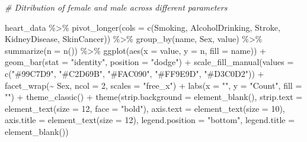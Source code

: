 \documentclass[
]{article}
\newenvironment{Shaded}{\begin{snugshade}}{\end{snugshade}}
\newcommand{\AttributeTok}[1]{\textcolor[rgb]{0.77,0.63,0.00}{#1}}
\newcommand{\CommentTok}[1]{\textcolor[rgb]{0.56,0.35,0.01}{\textit{#1}}}
\newcommand{\DecValTok}[1]{\textcolor[rgb]{0.00,0.00,0.81}{#1}}
\newcommand{\FunctionTok}[1]{\textcolor[rgb]{0.00,0.00,0.00}{#1}}
\newcommand{\NormalTok}[1]{#1}
\newcommand{\SpecialCharTok}[1]{\textcolor[rgb]{0.00,0.00,0.00}{#1}}
\newcommand{\StringTok}[1]{\textcolor[rgb]{0.31,0.60,0.02}{#1}}
\begin{document}
\begin{Shaded}
\begin{Highlighting}[]
\CommentTok{\# Ditribution of female and male across different parameters}

\NormalTok{heart\_data }\SpecialCharTok{\%\textgreater{}\%}
  \FunctionTok{pivot\_longer}\NormalTok{(}\AttributeTok{cols =} \FunctionTok{c}\NormalTok{(Smoking, AlcoholDrinking, Stroke, KidneyDisease, SkinCancer)) }\SpecialCharTok{\%\textgreater{}\%}
  \FunctionTok{group\_by}\NormalTok{(name, Sex, value) }\SpecialCharTok{\%\textgreater{}\%}
  \FunctionTok{summarize}\NormalTok{(}\AttributeTok{n =} \FunctionTok{n}\NormalTok{()) }\SpecialCharTok{\%\textgreater{}\%}
  \FunctionTok{ggplot}\NormalTok{(}\FunctionTok{aes}\NormalTok{(}\AttributeTok{x =}\NormalTok{ value, }\AttributeTok{y =}\NormalTok{ n, }\AttributeTok{fill =}\NormalTok{ name)) }\SpecialCharTok{+}
  \FunctionTok{geom\_bar}\NormalTok{(}\AttributeTok{stat =} \StringTok{"identity"}\NormalTok{, }\AttributeTok{position =} \StringTok{"dodge"}\NormalTok{) }\SpecialCharTok{+}
  \FunctionTok{scale\_fill\_manual}\NormalTok{(}\AttributeTok{values =} \FunctionTok{c}\NormalTok{(}\StringTok{"\#99C7D9"}\NormalTok{, }\StringTok{"\#C2D69B"}\NormalTok{, }\StringTok{"\#FAC090"}\NormalTok{, }\StringTok{"\#FF9E9D"}\NormalTok{, }\StringTok{"\#D3C0D2"}\NormalTok{)) }\SpecialCharTok{+}
  \FunctionTok{facet\_wrap}\NormalTok{(}\SpecialCharTok{\textasciitilde{}}\NormalTok{ Sex, }\AttributeTok{ncol =} \DecValTok{2}\NormalTok{, }\AttributeTok{scales =} \StringTok{"free\_x"}\NormalTok{) }\SpecialCharTok{+}
  \FunctionTok{labs}\NormalTok{(}\AttributeTok{x =} \StringTok{""}\NormalTok{, }\AttributeTok{y =} \StringTok{"Count"}\NormalTok{, }\AttributeTok{fill =} \StringTok{""}\NormalTok{) }\SpecialCharTok{+}
  \FunctionTok{theme\_classic}\NormalTok{() }\SpecialCharTok{+}
  \FunctionTok{theme}\NormalTok{(}\AttributeTok{strip.background =} \FunctionTok{element\_blank}\NormalTok{(), }\AttributeTok{strip.text =} \FunctionTok{element\_text}\NormalTok{(}\AttributeTok{size =} \DecValTok{12}\NormalTok{, }\AttributeTok{face =} \StringTok{"bold"}\NormalTok{),}
        \AttributeTok{axis.text =} \FunctionTok{element\_text}\NormalTok{(}\AttributeTok{size =} \DecValTok{10}\NormalTok{), }\AttributeTok{axis.title =} \FunctionTok{element\_text}\NormalTok{(}\AttributeTok{size =} \DecValTok{12}\NormalTok{),}
        \AttributeTok{legend.position =} \StringTok{"bottom"}\NormalTok{, }\AttributeTok{legend.title =} \FunctionTok{element\_blank}\NormalTok{())}
\end{Highlighting}
\end{Shaded}
\end{document}
